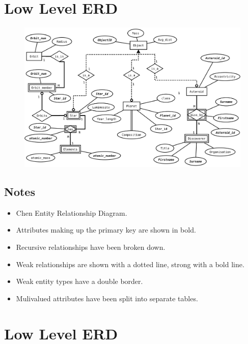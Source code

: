 \documentclass[11pt]{article} %
\begin{document}


\newpage
\section{Low Level ERD}
\label{sec:low_level_erd}

\begin{figure}[h]
	\centering
	\includegraphics[width=1.0\textwidth]{ERD-low-Chen.pdf}
\end{figure}

\subsection{Notes}
\label{sub:notes}

\begin{itemize}
	\item Chen Entity Relationship Diagram.
	\item Attributes making up the primary key are shown in bold.
	\item Recursive relationships have been broken down.
	\item Weak relationships are shown with a dotted line, strong with a bold
		line.
	\item Weak entity types have a double border.
	\item Mulivalued attributes have been split into separate tables.
\end{itemize}



\newpage
\section{Low Level ERD}
\label{sec:low_level_erd}
\end{document}
